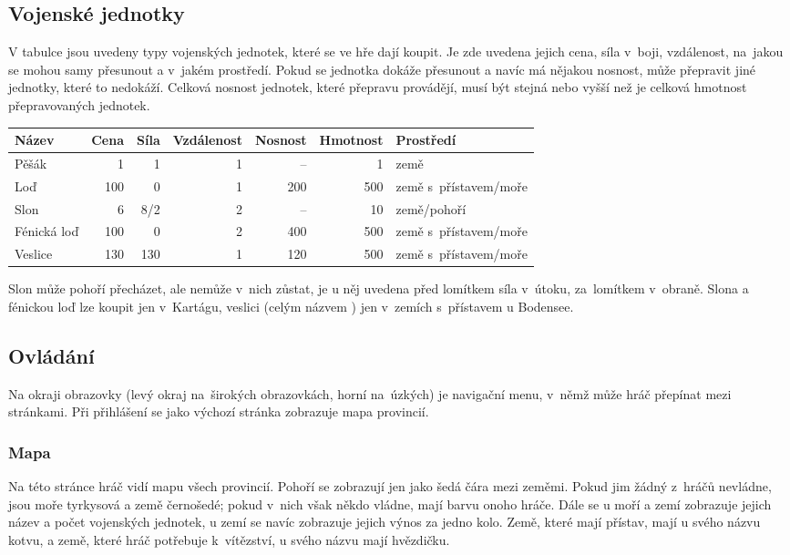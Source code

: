 \documentclass[a4paper,12pt]{article}
\begin{document}
\subsection{Vojenské jednotky}
V tabulce jsou uvedeny typy vojenských jednotek, které se ve hře dají koupit. Je zde uvedena jejich cena, síla v~boji, vzdálenost, na~jakou se mohou samy přesunout a v~jakém prostředí. Pokud se jednotka dokáže přesunout a navíc má nějakou nosnost, může přepravit jiné jednotky, které to nedokáží. Celková nosnost jednotek, které přepravu provádějí, musí být stejná nebo vyšší než je celková hmotnost přepravovaných jednotek.

\begin{tabular}{l r r r r r l}
Název		& Cena	& Síla	& Vzdálenost	&Nosnost& Hmotnost	& Prostředí\\ \hline
Pěšák		& 1		& 1		& 1			& --		& 1			& země\\
Loď			& 100	& 0		& 1			& 200	& 500		& země s~přístavem/moře\\
Slon			& 6		& 8/2	& 2			& --		& 10			& země/pohoří\\
Fénická loď	& 100	& 0		& 2			& 400	& 500		& země s~přístavem/moře\\
Veslice		& 130	& 130	& 1			& 120	& 500		& země s~přístavem/moře\\
\end{tabular}

Slon může pohoří přecházet, ale nemůže v~nich zůstat, je u něj uvedena před lomítkem síla v~útoku, za~lomítkem v~obraně. Slona a fénickou loď lze koupit jen v~Kartágu, veslici (celým názvem ) jen v~zemích s~přístavem u Bodensee.

\subsection{Ovládání}
Na okraji obrazovky (levý okraj na~širokých obrazovkách, horní na~úzkých) je navigační menu, v~němž může hráč přepínat mezi stránkami. Při přihlášení se jako výchozí stránka zobrazuje mapa provincií.
\subsubsection{Mapa}
Na této stránce hráč vidí mapu všech provincií. Pohoří se zobrazují jen jako šedá čára mezi zeměmi. Pokud jim žádný z~hráčů nevládne, jsou moře tyrkysová a země černošedé; pokud v~nich však někdo vládne, mají barvu onoho hráče. Dále se u moří a zemí zobrazuje jejich název a počet vojenských jednotek, u zemí se navíc zobrazuje jejich výnos za jedno kolo. Země, které mají přístav, mají u svého názvu kotvu, a země, které hráč potřebuje k~vítězství, u svého názvu mají hvězdičku.
\end{document}
